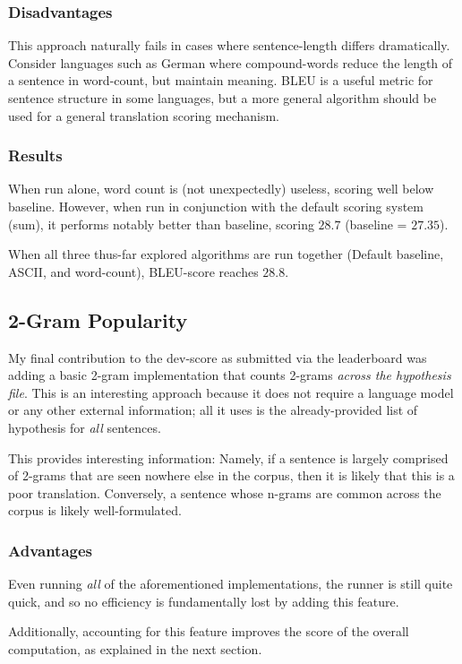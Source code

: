 \documentclass{article}
\begin{document}
\subsubsection{Disadvantages}
This approach naturally fails in cases where sentence-length differs dramatically. Consider languages such as German where compound-words reduce the length of a sentence in word-count, but maintain meaning. BLEU is a useful metric for sentence structure in some languages, but a more general algorithm should be used for a general translation scoring mechanism.

\subsubsection{Results}
When run alone, word count is (not unexpectedly) useless, scoring well below baseline. However, when run in conjunction with the default scoring system (sum), it performs notably better than baseline, scoring $28.7$ (baseline = $27.35$).

When all three thus-far explored algorithms are run together (Default baseline, ASCII, and word-count), BLEU-score reaches $28.8$.

\subsection{2-Gram Popularity}
My final contribution to the dev-score as submitted via the leaderboard was adding a basic 2-gram implementation that counts 2-grams \textit{across the hypothesis file}. This is an interesting approach because it does not require a language model or any other external information; all it uses is the already-provided list of hypothesis for \textit{all} sentences.

This provides interesting information: Namely, if a sentence is largely comprised of 2-grams that are seen nowhere else in the corpus, then it is likely that this is a poor translation. Conversely, a sentence whose n-grams are common across the corpus is likely well-formulated.

\subsubsection{Advantages}
Even running \textit{all} of the aforementioned implementations, the runner is still quite quick, and so no efficiency is fundamentally lost by adding this feature.

Additionally, accounting for this feature improves the score of the overall computation, as explained in the next section.
\end{document}
